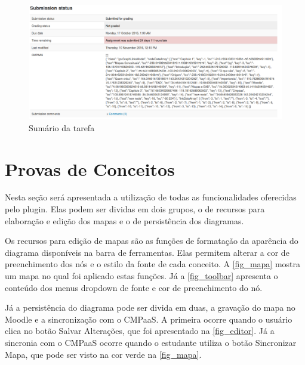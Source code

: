 \documentclass[
	12pt,				%
	openright,			%
	oneside,			%
	a4paper,			%
	english,			%
	french,				%
	spanish,			%
	brazil				%
	]{abntex2}
\begin{document}
\begin{figure}[htb]
	\caption{\label{fig_sumario} Sumário da tarefa}
	\begin{center}
		\includegraphics[scale=0.3]{sumario.png}
	\end{center}
\end{figure}

\section{Provas de Conceitos}

Nesta seção será apresentada a utilização de todas as funcionalidades oferecidas pelo plugin. Elas podem ser dividas em dois grupos, o de recursos para elaboração e edição dos mapas e o de persistência dos diagramas.

Os recursos para edição de mapas são as funções de formatação da aparência do diagrama disponíveis na barra de ferramentas. Elas permitem alterar a cor de preenchimento dos nós e o estilo da fonte de cada conceito. A \autoref{fig_mapa} mostra um mapa no qual foi aplicado estas funções. Já a \autoref{fig_toolbar} apresenta o conteúdo dos menus dropdown de fonte e cor de preenchimento do nó.

Já a persistência do diagrama pode ser divida em duas, a gravação do mapa no Moodle e a sincronização com o CMPaaS. A primeira ocorre quando o usuário clica no botão Salvar Alterações, que foi apresentado na \autoref{fig_editor}. Já a sincronia com o CMPaaS ocorre quando o estudante utiliza o botão Sincronizar Mapa, que pode ser visto na cor verde na \autoref{fig_mapa}.
\end{document}
